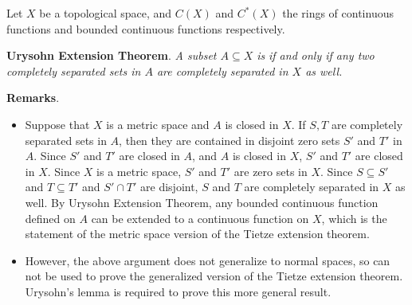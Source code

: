 \documentclass[12pt]{article}
\begin{document}
Let $X$ be a topological space, and $C(X)$ and $C^*(X)$ the rings of continuous functions and bounded continuous functions respectively.

\textbf{Urysohn Extension Theorem}.  \emph{A subset $A\subseteq X$ is}  \emph{if and only if any two completely separated sets in $A$ are completely separated in $X$ as well.}

\textbf{Remarks}.  
\begin{itemize}
\item
Suppose that $X$ is a metric space and $A$ is closed in $X$.  If $S,T$ are completely separated sets in $A$, then they are contained in disjoint zero sets $S'$ and $T'$ in $A$.  Since $S'$ and $T'$ are closed in $A$, and $A$ is closed in $X$, $S'$ and $T'$ are closed in $X$.  Since $X$ is a metric space, $S'$ and $T'$ are zero sets in $X$.  Since $S\subseteq S'$ and $T\subseteq T'$ and $S'\cap T'$ are disjoint, $S$ and $T$ are completely separated in $X$ as well.  By Urysohn Extension Theorem, any bounded continuous function defined on $A$ can be extended to a continuous function on $X$, which is the statement of the metric space version of the Tietze extension theorem.
\item
However, the above argument does not generalize to normal spaces, so can not be used to prove the generalized version of the Tietze extension theorem.  Urysohn's lemma is required to prove this more general result.
\end{itemize}
\end{document}
